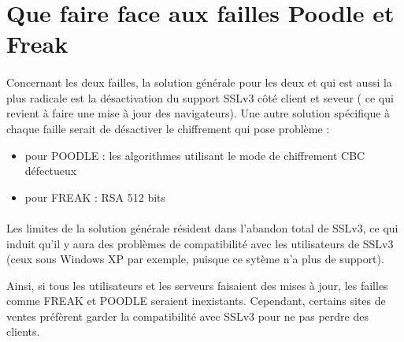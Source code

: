 \section{Que faire face aux failles Poodle et Freak}

\paragraph{}
Concernant les deux failles, la solution générale pour les deux et qui est aussi la plus radicale est la désactivation du support SSLv3 c\^oté client et seveur ( ce qui revient à faire une mise à jour des navigateurs). Une autre solution spécifique à chaque faille serait de désactiver le chiffrement qui pose problème :
\begin{itemize}
\item pour POODLE : les algorithmes utilisant le mode de chiffrement CBC défectueux
\item pour FREAK : RSA 512 bits
\end {itemize}

\paragraph{}
Les limites de la solution générale résident dans l'abandon total de SSLv3, ce qui induit qu'il y aura des problèmes de compatibilité avec les utilisateurs de SSLv3 (ceux sous Windows XP par exemple, puisque ce sytème n'a plus de support).

Ainsi, si tous les utilisateurs et les serveurs faisaient des mises à jour, les failles comme FREAK et POODLE seraient inexistants. Cependant, certains sites de ventes préfèrent garder la compatibilité avec SSLv3 pour ne pas perdre des clients.







 
